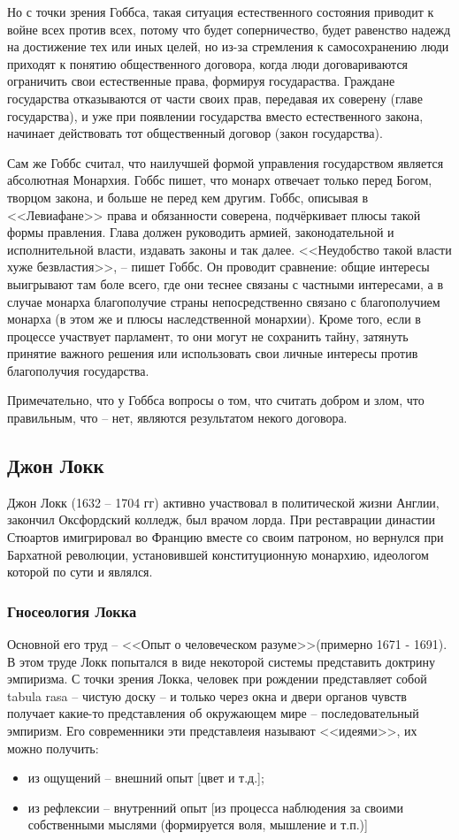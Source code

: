 \documentclass[a4paper, 12pt]{book} %
\begin{document}
Но с точки зрения Гоббса, такая ситуация естественного состояния приводит к войне всех против всех, потому что будет соперничество, будет равенство надежд на достижение тех или иных целей,  но из-за стремления к самосохранению люди приходят к понятию общественного договора, когда люди договариваются ограничить свои естественные права, формируя государаства. Граждане государства отказываются от части своих прав, передавая их соверену (главе государства), и уже при появлении государства вместо естественного закона, начинает действовать тот общественный договор (закон государства).

Сам же Гоббс считал, что наилучшей формой управления государством является абсолютная Монархия. Гоббс пишет, что монарх отвечает только перед Богом, творцом закона, и больше не перед кем другим. Гоббс, описывая в <<Левиафане>> права и обязанности соверена, подчёркивает плюсы такой формы правления. Глава должен руководить армией, законодательной и исполнительной власти, издавать законы и так далее. <<Неудобство такой власти хуже безвластия>>, --  пишет Гоббс. Он проводит сравнение: общие интересы выигрывают там боле всего, где они теснее связаны с частными интересами, а в случае монарха благополучие страны непосредственно связано с благополучием монарха (в этом же и плюсы наследственной монархии). Кроме того, если в процессе участвует парламент, то они могут не сохранить тайну, затянуть принятие важного решения или использовать свои личные интересы против благополучия государства.

Примечательно, что у Гоббса вопросы о том, что считать добром и злом, что правильным, что -- нет, являются результатом некого договора. 

\subsection{Джон Локк}
Джон Локк (1632 -- 1704 гг) активно участвовал в политической жизни Англии, закончил Оксфордский колледж, был врачом лорда. При реставрации династии Стюартов имигрировал во Францию вместе со своим патроном, но вернулся при Бархатной революции, установившей конституционную монархию, идеологом которой по сути и являлся.	

\subsubsection{Гносеология Локка}
Основной его труд -- <<Опыт о человеческом разуме>>(примерно 1671 - 1691). В этом труде Локк попытался в виде некоторой системы представить доктрину эмпиризма. С точки зрения Локка, человек при рождении представляет собой tabula rasa -- чистую доску -- и только через окна и двери органов чувств получает какие-то представления об окружающем мире -- последовательный эмпиризм. Его современники эти представлеия называют <<идеями>>, их можно получить:
\begin{itemize}
\item из ощущений -- внешний опыт [цвет и т.д.];
\item из рефлексии -- внутренний опыт [из процесса наблюдения за своими собственными мыслями (формируется воля, мышление и т.п.)]
\end{itemize}
\end{document}
